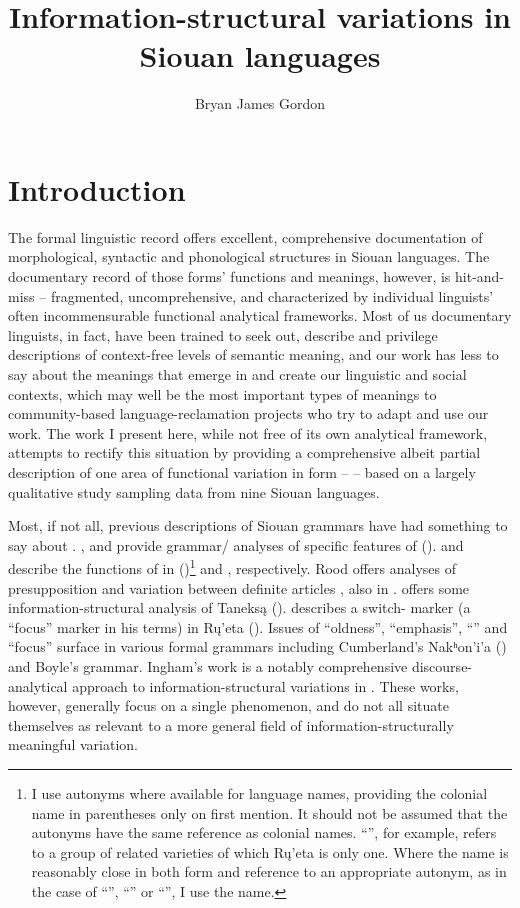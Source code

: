 \documentclass[output=paper]{LSP/langsci}
\author{Bryan James Gordon}
\title{Information-structural variations in {Siouan} languages}
\begin{document}
\section{Introduction}

	The formal linguistic record offers excellent, comprehensive documentation of morphological, syntactic and phonological structures in Siouan languages. The documentary record of those forms’ functions and meanings, however, is hit-and-miss -- fragmented, uncomprehensive, and characterized by individual linguists’ often incommensurable functional analytical frameworks. Most of us documentary linguists, in fact, have been trained to seek out, describe and privilege descriptions of context-free levels of semantic meaning, and our work has less to say about the meanings that emerge in and create our linguistic and social contexts, which may well be the most important types of meanings to community-based language-reclamation projects who try to adapt and use our work. The work I present here, while not free of its own analytical framework, attempts to rectify this situation by providing a comprehensive albeit partial description of one area of functional variation in form --  -- based on a largely qualitative  study sampling data from nine Siouan languages.
	
	Most, if not all, previous descriptions of Siouan grammars have had something to say about . \citet{Rudin1998}, \citet{Koontz2003} and \citet{Eschenberg2005} provide grammar/ analyses of specific features of  (). \citet[242--260]{Graczyk1991a} and \citet{deReuse1994} describe the functions of  in  ()\footnote{I use autonyms where available for language names, providing the  colonial name in parentheses only on first mention. It should not be assumed that the autonyms have the same reference as  colonial names. “”, for example, refers to a group of related varieties of which Rų’eta is only one. Where the  name is reasonably close in both form and reference to an appropriate autonym, as in the case of ``'', ``'' or ``'', I use the  name.} and , respectively. Rood offers analyses of presupposition \citeyearpar{Rood1977} and variation between definite articles \citeyearpar{Rood1985}, also in . \citet{Kaufman2008} offers some information-structural analysis of Taneksą (). \citet{Wolvengrey1991} describes a switch- marker (a “focus” marker in his terms) in Rų’eta (). Issues of “oldness”, “emphasis”, “” and “focus” surface in various formal grammars including Cumberland’s \citeyearpar{Cumberland2005} Nakʰon’i’a () and Boyle’s \citeyearpar{Boyle2007}  grammar. Ingham’s \citeyearpar{Ingham2003} work is a notably comprehensive discourse-analytical approach to information-structural variations in . These works, however, generally focus on a single phenomenon, and do not all situate themselves as relevant to a more general field of information-structurally meaningful variation. 
	
\end{document}
